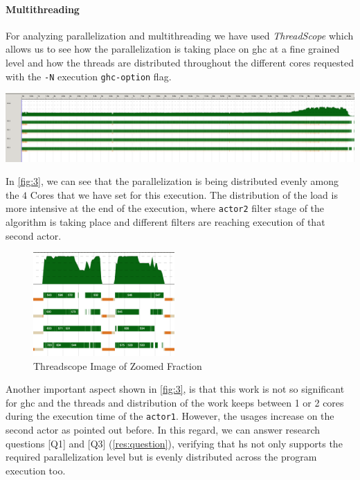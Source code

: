\documentclass[preprint]{elsarticle}
\begin{document}
\paragraph{Multithreading} For analyzing parallelization and multithreading we have used \textit{ThreadScope} \cite{threadscope} which allows us to see how the parallelization is taking place on \acrshort{ghc} at a fine grained level and how the threads are distributed throughout the different cores requested with the \texttt{-N} execution \texttt{ghc-option} flag.

\begin{minipage}[t!]{\linewidth}

  \includegraphics[width=\textwidth]{screen_1}
  \captionsetup{type=figure}
  \label{fig:3}
\end{minipage}

In \autoref{fig:3}, we can see that the parallelization is being distributed evenly among the $4$ Cores that we have set for this execution.
The distribution of the load is more intensive at the end of the execution, where \texttt{actor2} filter stage 
of the algorithm is taking place and different filters are reaching execution of that second actor.

\begin{figure}
  \begin{center}
     \includegraphics[width=0.48\textwidth] {screen_2}
       \end{center}
     \caption{Threadscope Image of Zoomed Fraction}
     \label{fig:4}
 \end{figure}
Another important aspect shown in \autoref{fig:3}, is that this work is not so significant for \acrshort{ghc} and the threads and distribution of the work keeps between 1 or 2 cores during the execution time of the \texttt{actor1}. However, the usages increase on the second actor as pointed out before. In this regard, we can answer research questions [Q1] and [Q3] (\autoref{res:question}), verifying that \acrshort{hs} not only supports the required parallelization level but is evenly distributed across the program execution too.
\end{document}
